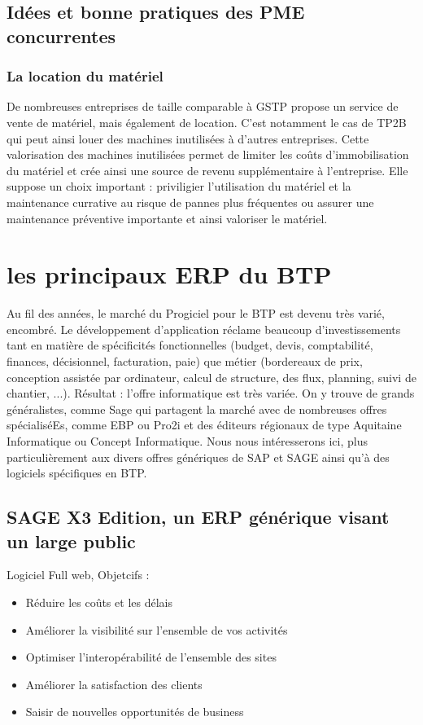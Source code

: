 \subsection{Idées et bonne pratiques des PME concurrentes}
\subsubsection{La location du matériel}
De nombreuses entreprises de taille comparable à GSTP propose un service de vente de matériel, mais également de location. 
C'est notamment le cas de TP2B qui peut ainsi louer des machines inutilisées à d'autres entreprises.
Cette valorisation des machines inutilisées permet de limiter les coûts d'immobilisation du matériel et crée ainsi une source de revenu supplémentaire à l'entreprise. Elle suppose un choix important : 
priviligier l'utilisation du matériel et la maintenance currative au risque de pannes plus fréquentes
ou assurer une maintenance préventive importante et ainsi valoriser le matériel.


\section{les principaux ERP du BTP}
Au fil des années, le marché du Progiciel pour le BTP est devenu très varié, encombré. 
Le développement d'application réclame beaucoup d'investissements tant en matière de spécificités fonctionnelles (budget, devis, comptabilité, finances, décisionnel, facturation, paie) que métier (bordereaux de prix, conception assistée par ordinateur, calcul de structure, des flux, planning, suivi de chantier, ...). 
Résultat : l'offre informatique est très variée. On y trouve de grands généralistes, comme Sage qui partagent la marché avec de nombreuses offres spécialiséEs, comme EBP ou Pro2i et des éditeurs régionaux de type Aquitaine Informatique ou Concept Informatique.
Nous nous intéresserons ici, plus particulièrement aux divers offres génériques de SAP et SAGE ainsi qu'à des logiciels spécifiques en BTP.
\subsection{SAGE X3 Edition, un ERP générique visant un large public}
Logiciel Full web,
Objetcifs :
\begin{itemize}
    \item Réduire les coûts et les délais
    \item Améliorer la visibilité sur l'ensemble de vos activités
	\item Optimiser l'interopérabilité de l'ensemble des sites
    \item Améliorer la satisfaction des clients
	\item Saisir de nouvelles opportunités de business
\end{itemize}

